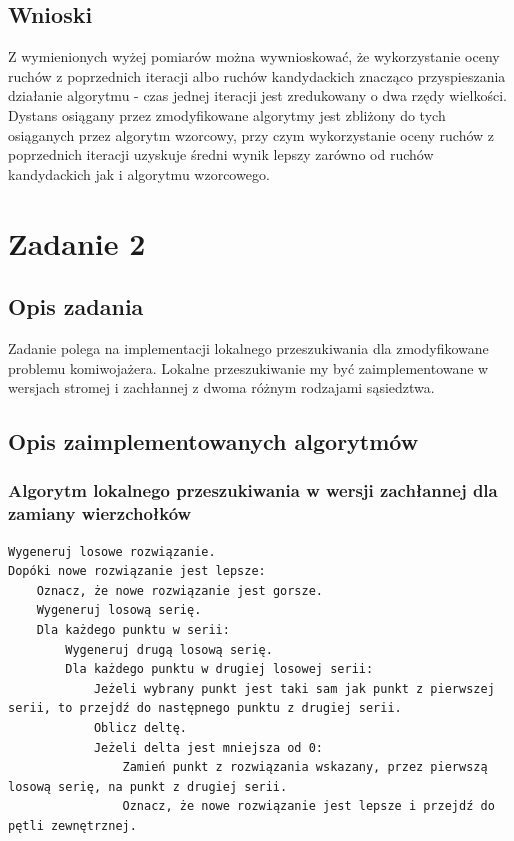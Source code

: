 \documentclass[a4paper]{article}
\begin{document}
\subsection{Wnioski}

Z wymienionych wyżej pomiarów można wywnioskować, że wykorzystanie oceny ruchów z poprzednich iteracji albo ruchów kandydackich znacząco przyspieszania działanie algorytmu - czas jednej iteracji jest zredukowany o dwa rzędy wielkości. Dystans osiągany przez zmodyfikowane algorytmy jest zbliżony do tych osiąganych przez algorytm wzorcowy, przy czym wykorzystanie oceny ruchów z poprzednich iteracji uzyskuje średni wynik lepszy zarówno od ruchów kandydackich jak i algorytmu wzorcowego.

\section{Zadanie 2}

\subsection{Opis zadania}

Zadanie polega na implementacji lokalnego przeszukiwania dla zmodyfikowane problemu komiwojażera. Lokalne przeszukiwanie my być zaimplementowane w wersjach stromej i zachłannej z dwoma różnym rodzajami sąsiedztwa.

\subsection{Opis zaimplementowanych algorytmów}

\subsubsection{Algorytm lokalnego przeszukiwania w wersji zachłannej dla zamiany wierzchołków}

\begin{lstlisting}
Wygeneruj losowe rozwiązanie.
Dopóki nowe rozwiązanie jest lepsze:
    Oznacz, że nowe rozwiązanie jest gorsze.
    Wygeneruj losową serię.
    Dla każdego punktu w serii:
        Wygeneruj drugą losową serię.
        Dla każdego punktu w drugiej losowej serii:
            Jeżeli wybrany punkt jest taki sam jak punkt z pierwszej serii, to przejdź do następnego punktu z drugiej serii.
            Oblicz deltę.
            Jeżeli delta jest mniejsza od 0:
                Zamień punkt z rozwiązania wskazany, przez pierwszą losową serię, na punkt z drugiej serii.
                Oznacz, że nowe rozwiązanie jest lepsze i przejdź do pętli zewnętrznej.
\end{lstlisting}
\end{document}
